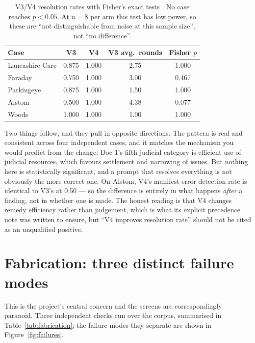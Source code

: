\begin{table}[htbp]
\centering
\footnotesize
\caption[Ablation significance]{V3/V4 resolution rates with Fisher's exact tests
\cite{fisher1922interpretation}.
No case reaches $p<0.05$. At $n=8$ per arm this test has low power, so these are
``not distinguishable from noise at this sample size'', not ``no difference''.}
\label{tab:ablation}
\begin{tabular}{@{}lcccc@{}}
\toprule
\textbf{Case} & \textbf{V3} & \textbf{V4} & \textbf{V3 avg.\ rounds} & \textbf{Fisher $p$} \\
\midrule
Lancashire Care & 0.875 & 1.000 & 2.75 & 1.000 \\
Faraday & 0.750 & 1.000 & 3.00 & 0.467 \\
Parkingeye & 0.875 & 1.000 & 1.50 & 1.000 \\
Alstom & 0.500 & 1.000 & 4.38 & 0.077 \\
Woods & 1.000 & 1.000 & 1.00 & 1.000 \\
\bottomrule
\end{tabular}
\end{table}

Two things follow, and they pull in opposite directions. The pattern is real and
consistent across four independent cases, and it matches the mechanism you would
predict from the change: Doc 1's fifth judicial category is efficient use of
judicial resources, which favours settlement and narrowing of issues. But nothing
here is statistically significant, and a prompt that resolves everything is not
obviously the more correct one. On Alstom, V4's manifest-error detection rate is
identical to V3's at 0.50 --- so the difference is entirely in what happens
\emph{after} a finding, not in whether one is made. The honest reading is that V4
changes remedy efficiency rather than judgement, which is what its explicit
precedence note was written to ensure, but ``V4 improves resolution rate'' should
not be cited as an unqualified positive.

\section{Fabrication: three distinct failure modes}
\label{sec:fabrication}

This is the project's central concern and the screens are correspondingly
paranoid. Three independent checks run over the corpus, summarised in
Table~\ref{tab:fabrication}; the failure modes they separate are shown in
Figure~\ref{fig:failures}.


